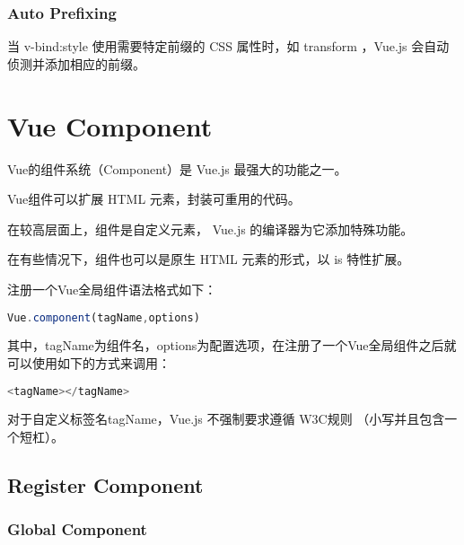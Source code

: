 \begin{lstlisting}[language=JavaScript]

\end{lstlisting}


\subsection{Auto Prefixing}

当 v-bind:style 使用需要特定前缀的 CSS 属性时，如 transform ，Vue.js 会自动侦测并添加相应的前缀。




\chapter{Vue Component}

Vue的组件系统（Component）是 Vue.js 最强大的功能之一。


Vue组件可以扩展 HTML 元素，封装可重用的代码。

\begin{compactitem}
\item 在较高层面上，组件是自定义元素， Vue.js 的编译器为它添加特殊功能。
\item 在有些情况下，组件也可以是原生 HTML 元素的形式，以 is 特性扩展。
\end{compactitem}


注册一个Vue全局组件语法格式如下：




\begin{lstlisting}[language=JavaScript]
Vue.component(tagName,options)
\end{lstlisting}

其中，tagName为组件名，options为配置选项，在注册了一个Vue全局组件之后就可以使用如下的方式来调用：


\begin{lstlisting}[language=JavaScript]
<tagName></tagName>
\end{lstlisting}

对于自定义标签名tagName，Vue.js 不强制要求遵循 W3C规则 （小写并且包含一个短杠）。

\section{Register Component}


\subsection{Global Component}


